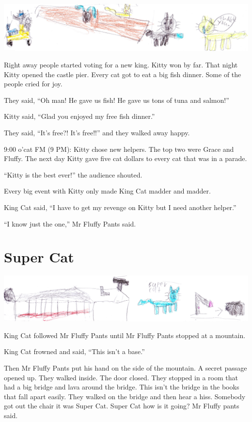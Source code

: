 \documentclass[12pt,oneside]{krantz}
\begin{document}
\includegraphics{img/thankyou.jpg}

Right away people started voting for a new king. Kitty won by far. That
night Kitty opened the castle pier. Every cat got to eat a big fish
dinner. Some of the people cried for joy.

They said, ``Oh man! He gave us fish! He gave us tons of tuna and
salmon!''

Kitty said, ``Glad you enjoyed my free fish dinner.''

They said, ``It's free?! It's free!!'' and they walked away happy.

9:00 o'cat FM (9 PM): Kitty chose new helpers. The top two were Grace
and Fluffy. The next day Kitty gave five cat dollars to every cat that
was in a parade.

``Kitty is the best ever!'' the audience shouted.

Every big event with Kitty only made King Cat madder and madder.

King Cat said, ``I have to get my revenge on Kitty but I need another
helper.''

``I know just the one,'' Mr Fluffy Pants said.

\hypertarget{super-cat}{%
\chapter{Super Cat}\label{super-cat}}

\includegraphics{img/supercat.jpg}

King Cat followed Mr Fluffy Pants until Mr Fluffy Pants stopped at a
mountain.

King Cat frowned and said, ``This isn't a base.''

Then Mr Fluffy Pants put his hand on the side of the mountain. A secret
passage opened up. They walked inside. The door closed. They stopped in
a room that had a big bridge and lava around the bridge. This isn't the
bridge in the books that fall apart easily. They walked on the bridge
and then hear a hiss. Somebody got out the chair it was Super Cat. Super
Cat how is it going? Mr Fluffy pants said.
\end{document}
